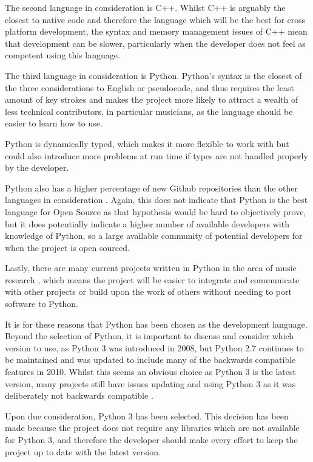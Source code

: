 The second language in consideration is C++. Whilst C++ is arguably the closest to native code and therefore the language which will be the best for cross platform development, the syntax and memory management issues of C++ mean that development can be slower, particularly when the developer does not feel as competent using this language.

The third language in consideration is Python. Python's syntax is the closest of the three considerations to English or pseudocode, and thus requires the least amount of key strokes and makes the project more likely to attract a wealth of less technical contributors, in particular musicians, as the language should be easier to learn how to use.

Python is dynamically typed, which makes it more flexible to work with but could also introduce more problems at run time if types are not handled properly by the developer.
 
 Python also has a higher percentage of new Github repositories than the other languages in consideration \parencite{Redmonk}. Again, this does not indicate that Python is the best language for Open Source as that hypothesis would be hard to objectively prove, but it does potentially indicate a higher number of available developers with knowledge of Python, so a large available community of potential developers for when the project is open sourced.
 
 Lastly, there are many current projects written in Python in the area of music research \parencite{pmus}, which means the project will be easier to integrate and communicate with other projects or build upon the work of others without needing to port software to Python.

It is for these reasons that Python has been chosen as the development language. Beyond the selection of Python, it is important to discuss and consider which version to use, as Python 3 was introduced in 2008, but Python 2.7 continues to be maintained and was updated to include many of the backwards compatible features in 2010. Whilst this seems an obvious choice as Python 3 is the latest version, many projects still have issues updating and using Python 3 as it was deliberately not backwards compatible \parencite{Foundation2}.

Upon due consideration, Python 3 has been selected. This decision has been made because the project does not require any libraries which are not available for Python 3, and therefore the developer should make every effort to keep the project up to date with the latest version.

